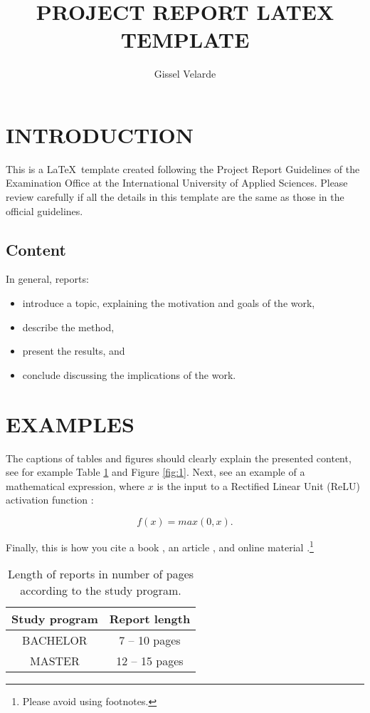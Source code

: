 \documentclass[11pt,a4paper]{article}
\title{PROJECT REPORT LATEX TEMPLATE}
\author{ Gissel Velarde }
\begin{document}
\maketitle	

 \tableofcontents
 \pagebreak

\section{INTRODUCTION}
This is a \LaTeX\  template created following the Project Report Guidelines of the Examination Office at the International University of Applied Sciences. Please review carefully if all the details in this template are the same as those in the official guidelines. 

\subsection{Content}
In general, reports:

\begin{itemize}
\item introduce a topic, explaining the motivation and goals of the work, 
\item describe the method, 
\item  present the results, and
\item conclude discussing the implications of the work.
\end{itemize}

\section{EXAMPLES}
The captions of tables and figures should clearly explain the presented content, see for example Table \ref{table:1} and Figure \ref{fig:1}. Next, see an example of a mathematical expression, where $x$ is the input to a Rectified Linear Unit (ReLU) activation function :

\begin{equation} \label{e:1}
f(x)=max(0,x). 
\end{equation}

Finally, this is how you cite a book , an article , and online material .\footnote{Please avoid using footnotes.} 

\begin{table}[h!]
\centering
\begin{tabular}{|c c|} 
 \hline
Study program &  Report length \\  \hline
BACHELOR &  7 -- 10  pages  \\ 
MASTER  & 12 -- 15 pages\\

 \hline
\end{tabular}
\caption{Length of reports in number of pages according to the study program.}
\label{table:1}
\end{table}
\end{document}
